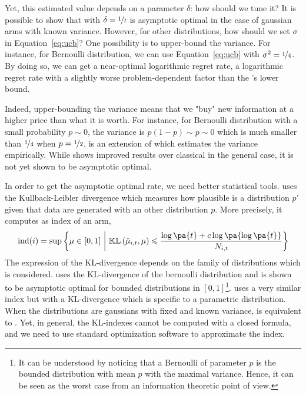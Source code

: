 {Yet, this estimated value depends on a parameter $\delta$: how should we tune it? It is possible to show that \UCB with $\delta = \nicefrac{1}{t}$ is asymptotic optimal in the case of gaussian arms with known variance. However, for other distributions, how should we set $\sigma$ in Equation~\ref{eq:ucb}? One possibility is to upper-bound the variance. For instance, for Bernoulli distribution, we can use Equation~\ref{eq:ucb} with $\sigma^2 = \nicefrac{1}{4}$. By doing so, we can get a near-optimal logarithmic regret rate, \ie a logarithmic regret rate with a slightly worse problem-dependent factor than the \citet{lai1985asymptotically}'s lower bound.

Indeed, upper-bounding the variance means that we "buy" new information at a higher price than what it is worth. For instance, for Bernoulli distribution with a small probability $p\sim 0$, the variance is $p(1-p) \sim p \sim 0$ which is much smaller than $\nicefrac{1}{4}$ when $p=\nicefrac{1}{2}$. \UCBV \citep{audibert2009ucbv} is an extension of \UCB which estimates the variance empirically. While \UCBV shows improved results over classical \UCB in the general case, it is not yet shown to be asymptotic optimal. 

In order to get the asymptotic optimal rate, we need better statistical tools. \KLUCB \citep{cappe2013klucb} uses the Kullback-Leibler divergence which measures how plausible is a distribution $p'$ given that data are generated with an other distribution $p$. More precisely, it computes as index of an arm, 
\begin{equation}
\label{eq:klucb}
\text{ind}(i) = \sup \left\{\mu \in[0,1]\ \bigg{|}\  \mathbb{KL}\left(\hat{\mu}_{i,t}, \mu\right) \leqslant \frac{\log\pa{t} + c\log\pa{\log\pa{t}}}{N_{i,t}} \right\}
\end{equation}
 The expression of the KL-divergence depends on the family of distributions which is considered. \KLUCB uses the KL-divergence of the bernoulli distribution and is shown to be asymptotic optimal for bounded distributions in $\left[0,1\right]$\footnote{It can be understood by noticing that a Bernoulli of parameter $p$ is the bounded distribution with mean $p$ with the maximal variance. Hence, it can be seen as the worst case from an information theoretic point of view. }. \klUCB uses a very similar index but with a KL-divergence which is specific to a parametric distribution. When the distributions are gaussians with fixed and known variance, \klUCB is equivalent to \UCB. Yet, in general, the KL-indexes cannot be computed with a closed formula, and we need to use standard optimization software to approximate the index.

}
